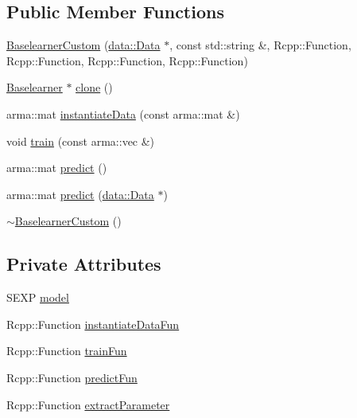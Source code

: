 \subsection*{Public Member Functions}
\begin{DoxyCompactItemize}
\item 
\hyperlink{classblearner_1_1_baselearner_custom_ac812a6b0d79f75560caa91ec101ca6e3}{Baselearner\+Custom} (\hyperlink{classdata_1_1_data}{data\+::\+Data} $\ast$, const std\+::string \&, Rcpp\+::\+Function, Rcpp\+::\+Function, Rcpp\+::\+Function, Rcpp\+::\+Function)
\item 
\hyperlink{classblearner_1_1_baselearner}{Baselearner} $\ast$ \hyperlink{classblearner_1_1_baselearner_custom_a1442790658c7ad08832a94fbc60ff94a}{clone} ()
\item 
arma\+::mat \hyperlink{classblearner_1_1_baselearner_custom_a83c25e681bb606ae4a36c249a36229b9}{instantiate\+Data} (const arma\+::mat \&)
\item 
void \hyperlink{classblearner_1_1_baselearner_custom_a31e3921f86f267d36135d07bf1d16551}{train} (const arma\+::vec \&)
\item 
arma\+::mat \hyperlink{classblearner_1_1_baselearner_custom_a7d9640dbb9a118b77735cf79a5850652}{predict} ()
\item 
arma\+::mat \hyperlink{classblearner_1_1_baselearner_custom_aeeb3a3934b94f095bfe689cff385dfa7}{predict} (\hyperlink{classdata_1_1_data}{data\+::\+Data} $\ast$)
\item 
\hyperlink{classblearner_1_1_baselearner_custom_a5238f894da2b3e746b3a9e647b4ba6e2}{$\sim$\+Baselearner\+Custom} ()
\end{DoxyCompactItemize}
\subsection*{Private Attributes}
\begin{DoxyCompactItemize}
\item 
S\+E\+XP \hyperlink{classblearner_1_1_baselearner_custom_a99cf99e3a150fdbf77d7e738682df1cf}{model}
\item 
Rcpp\+::\+Function \hyperlink{classblearner_1_1_baselearner_custom_a6372076461467dc41f7af4ee198a91c6}{instantiate\+Data\+Fun}
\item 
Rcpp\+::\+Function \hyperlink{classblearner_1_1_baselearner_custom_a7755acb5207be9e839cc9bfd75df649b}{train\+Fun}
\item 
Rcpp\+::\+Function \hyperlink{classblearner_1_1_baselearner_custom_ac08fe685a93483f036b3019b6ed011cb}{predict\+Fun}
\item 
Rcpp\+::\+Function \hyperlink{classblearner_1_1_baselearner_custom_a4b88f7464f9c686a35d40f438119ea40}{extract\+Parameter}
\end{DoxyCompactItemize}
